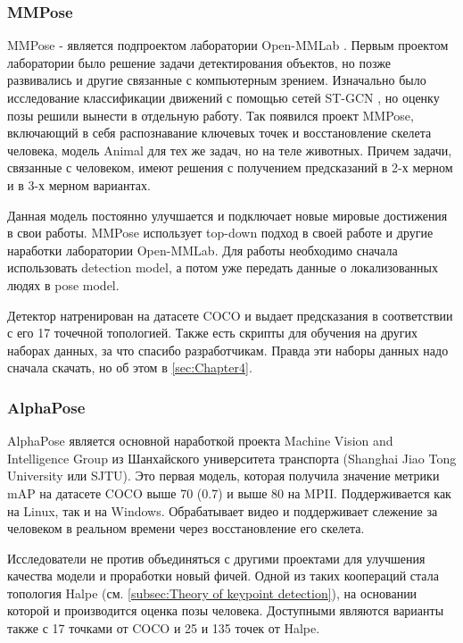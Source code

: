 \subsubsection{MMPose}
\label{subsubsec:mmpose_desc}

MMPose - является подпроектом лаборатории Open-MMLab \cite{mmpose2020}. Первым проектом лаборатории было решение задачи детектирования объектов, но позже развивались и другие связанные с компьютерным зрением. Изначально было исследование классификации движений с помощью сетей ST-GCN \cite{STGCN}, но оценку позы решили вынести в отдельную работу. Так появился проект MMPose, включающий в себя распознавание ключевых точек и восстановление скелета человека, модель Animal для тех же задач, но на теле животных. Причем задачи, связанные с человеком, имеют решения с получением предсказаний в 2-х мерном и в 3-х мерном вариантах.

Данная модель постоянно улучшается и подключает новые мировые достижения в свои работы. MMPose использует top-down подход в своей работе и другие наработки лаборатории Open-MMLab. Для работы необходимо сначала использовать detection model, а потом уже передать данные о локализованных людях в pose model.

Детектор натренирован на датасете COCO и выдает предсказания в соответствии с его 17 точечной топологией. Также есть скрипты для обучения на других наборах данных, за что спасибо разработчикам. Правда эти наборы данных надо сначала скачать, но об этом в \autoref{sec:Chapter4}.



\subsubsection{AlphaPose}
\label{subsubsec:alphapose_desc}

AlphaPose является основной наработкой проекта Machine Vision and Intelligence Group из Шанхайского университета транспорта (Shanghai Jiao Tong University или SJTU). Это первая модель, которая получила значение метрики mAP на датасете COCO выше 70 (0.7) и выше 80 на MPII. Поддерживается как на Linux, так и на Windows. Обрабатывает видео и поддерживает слежение за человеком в реальном времени через восстановление его скелета.

Исследователи не против объединяться с другими проектами для улучшения качества модели и проработки новый фичей. Одной из таких коопераций стала топология Halpe (см. \autoref{subsec:Theory of keypoint detection}), на основании которой и производится оценка позы человека. Доступными являются варианты также с 17 точками от COCO и 25 и 135 точек от Halpe.

